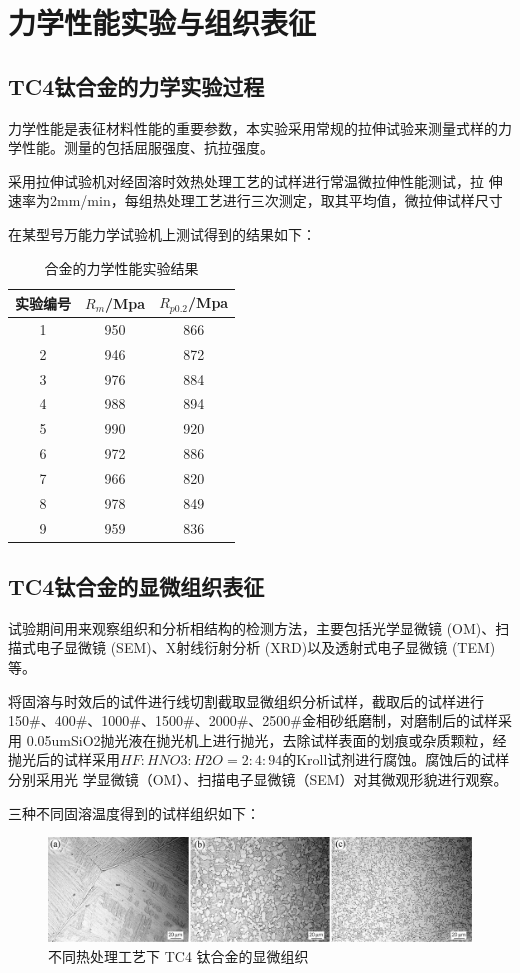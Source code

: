 \chapter{力学性能实验与组织表征}

\section{TC4钛合金的力学实验过程}
力学性能是表征材料性能的重要参数，本实验采用常规的拉伸试验来测量式样的力学性能。测量的包括屈服强度、抗拉强度。

采用拉伸试验机对经固溶时效热处理工艺的试样进行常温微拉伸性能测试，拉 伸速率为2mm/min，每组热处理工艺进行三次测定，取其平均值，微拉伸试样尺寸

在某型号万能力学试验机上测试得到的结果如下：

\begin{table}[htbp]
	\centering
	\caption{\ti 合金的力学性能实验结果}
	\label{sec:mystrength}
		\begin{tabular}{ccc}
			\toprule
			实验编号&$ R_m $/Mpa&$ R_{p0.2} $/Mpa \\
			\midrule
			1 & 950 & 866\\
			2 & 946 & 872\\
			3 & 976 & 884\\
			4 & 988 & 894\\
			5 & 990 & 920\\
			6 & 972 & 886\\
			7 & 966 & 820\\
			8 & 978 & 849\\
			9 & 959 & 836\\
			\bottomrule
		\end{tabular}
\end{table}
\newpage
\section{TC4钛合金的显微组织表征}
试验期间用来观察组织和分析相结构的检测方法，主要包括光学显微镜 (OM)、扫描式电子显微镜 (SEM)、X射线衍射分析 (XRD)以及透射式电子显微镜 (TEM)等。

将固溶与时效后的试件进行线切割截取显微组织分析试样，截取后的试样进行 150\#、400\#、1000\#、1500\#、2000\#、2500\#金相砂纸磨制，对磨制后的试样采用 0.05umSiO2抛光液在抛光机上进行抛光，去除试样表面的划痕或杂质颗粒，经抛光后的试样采用$ HF:HNO3:H2O=2:4:94 $的Kroll试剂进行腐蚀。腐蚀后的试样分别采用光 学显微镜（OM）、扫描电子显微镜（SEM）对其微观形貌进行观察。


三种不同固溶温度得到的试样组织如下：
\begin{figure}[h!]
	\centering
	\includegraphics[width=0.7\linewidth]{pic/demo-mico}
	\caption{不同热处理工艺下 TC4 钛合金的显微组织}
	\label{fig:demo-mico}
\end{figure}
